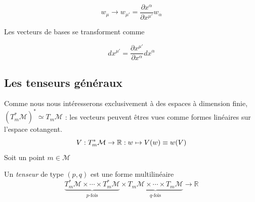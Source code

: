  \begin{equation}
     \boxed{w_\mu \to w_{\mu '} = \frac{\partial x^{\alpha }}{\partial x^{\mu '}} w_{\alpha}}
 \end{equation}

Les vecteurs de bases se transforment comme

$$dx^{\mu'} = \frac{\partial x^{\mu'}}{\partial x^{\alpha}} dx^{\alpha}$$
\subsection{Les tenseurs généraux}
Comme nous nous intéresserons exclusivement à des espaces à dimension finie, $(T^*_m \mathcal{M})^* \simeq T_m \mathcal{M}$ : les vecteurs peuvent êtres vues comme formes linéaires sur l'espace cotangent.
\begin{equation}
    V: T^*_m \mathcal{M} \to \mathbb{R} : w \mapsto V(w) \equiv w(V )
\end{equation}
Soit un point $m\in \mathcal{M}$
\begin{theoremframe}
    \begin{rap}
        \label{rap:tenseur}
        Un \emph{tenseur} de type $(p,q)$ est une forme multilinéaire 
        \begin{equation}
            \underbrace{T^*_{m}\mathcal{M} \times \cdots \times T^*_{m}\mathcal{M}}_\text{$p$-fois} \times \underbrace{T_{m}\mathcal{M} \times \cdots \times T_{m}\mathcal{M}}_\text{$q$-fois}  \to \mathbb{R}
        \end{equation}
    \end{rap}
\end{theoremframe}
